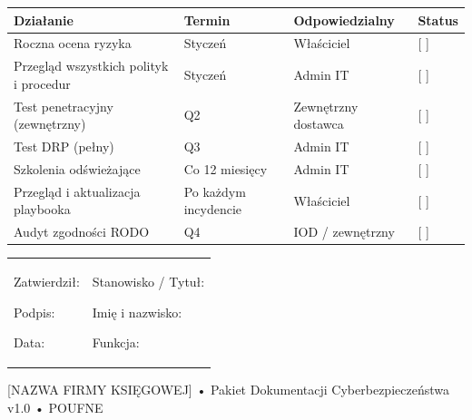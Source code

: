 \documentclass[12pt,a4paper]{article}
\begin{document}
\begin{longtable}[]{@{}>{\raggedright\arraybackslash}p{}>{\raggedright\arraybackslash}p{}>{\raggedright\arraybackslash}p{}>{\raggedright\arraybackslash}p{}@{}}
\toprule\noalign{}
Działanie & Termin & Odpowiedzialny & Status \\
\midrule\noalign{}
\endhead
\bottomrule\noalign{}
\endlastfoot
Roczna ocena ryzyka & Styczeń & Właściciel & {[} {]}
\underline{\hspace{2cm}} \\
Przegląd wszystkich polityk i procedur & Styczeń & Admin IT & {[} {]}
\underline{\hspace{2cm}} \\
Test penetracyjny (zewnętrzny) & Q2 & Zewnętrzny dostawca & {[} {]}
\underline{\hspace{2cm}} \\
Test DRP (pełny) & Q3 & Admin IT & {[} {]} \underline{\hspace{2cm}} \\
Szkolenia odświeżające & Co 12 miesięcy & Admin IT & {[} {]}
\underline{\hspace{2cm}} \\
Przegląd i aktualizacja playbooka & Po każdym incydencie & Właściciel &
{[} {]} \underline{\hspace{2cm}} \\
Audyt zgodności RODO & Q4 & IOD / zewnętrzny & {[} {]}
\underline{\hspace{2cm}} \\
\end{longtable}

\begin{longtable}[]{@{}
  >{\raggedright\arraybackslash}p{}
  >{\raggedright\arraybackslash}p{}@{}}
\toprule\noalign{}
\endhead
\bottomrule\noalign{}
\endlastfoot
\begin{minipage}[t]{\linewidth}\raggedright
Zatwierdził:

Podpis: \underline{\hspace{3cm}}

Data: \underline{\hspace{4cm}}
\end{minipage} & \begin{minipage}[t]{\linewidth}\raggedright
Stanowisko / Tytuł:

Imię i nazwisko: \underline{\hspace{3cm}}

Funkcja: \underline{\hspace{3cm}}
\end{minipage} \\
\end{longtable}

{[}NAZWA FIRMY KSIĘGOWEJ{]} • Pakiet Dokumentacji Cyberbezpieczeństwa
v1.0 • POUFNE
\end{document}
